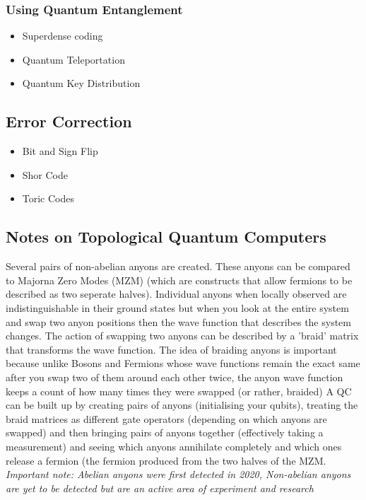 



\subsubsection{Using Quantum Entanglement}
\begin{itemize}
    \item Superdense coding
    \item Quantum Teleportation
    \item Quantum Key Distribution
\end{itemize}



\subsection{Error Correction}
\begin{itemize}
    \item Bit and Sign Flip
    \item Shor Code
    \item Toric Codes
\end{itemize}
\subsection{Notes on Topological Quantum Computers}
Several pairs of non-abelian anyons are created. These anyons can be compared to Majorna Zero Modes (MZM) (which are constructs that allow fermions to be described as two seperate halves). Individual anyons when locally observed are indistinguishable in their ground states but when you look at the entire system and swap two anyon positions then the wave function that describes the system changes. The action of swapping two anyons can be described by a 'braid' matrix that transforms the wave function. The idea of braiding anyons is important because unlike Bosons and Fermions whose wave functions remain the exact same after you swap two of them around each other twice, the anyon wave function keeps a count of how many times they were swapped (or rather, braided)
A QC can be built up by creating pairs of anyons (initialising your qubits), treating the braid matrices as different gate operators (depending on which anyons are swapped) and then bringing pairs of anyons together (effectively taking a measurement) and seeing which anyons annihilate completely and which ones release a fermion (the fermion produced from the two halves of the MZM.\\
\textit{Important note: Abelian anyons were first detected in 2020, Non-abelian anyons are yet to be detected but are an active area of experiment and research}

